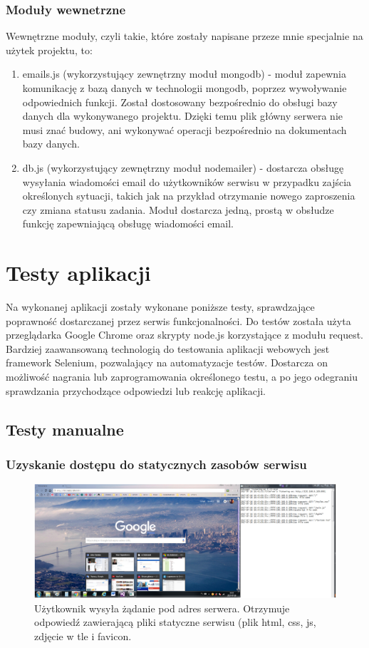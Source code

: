 \documentclass[12pt]{report}
\begin{document}
\subsection{Moduły wewnetrzne}
Wewnętrzne moduły, czyli takie, które zostały napisane przeze mnie specjalnie na użytek projektu, to:
\begin{enumerate}
\item emails.js (wykorzystujący zewnętrzny moduł mongodb) - moduł zapewnia komunikację z bazą danych w technologii mongodb, poprzez wywoływanie odpowiednich funkcji. 
Został dostosowany bezpośrednio do obsługi bazy danych dla wykonywanego projektu. 
Dzięki temu plik główny serwera nie musi znać budowy, ani wykonywać operacji bezpośrednio na dokumentach bazy danych.
\item db.js (wykorzystujący zewnętrzny moduł nodemailer) - dostarcza obsługę wysyłania wiadomości email do użytkowników serwisu w przypadku zajścia określonych sytuacji, takich jak na przykład otrzymanie nowego zaproszenia czy zmiana statusu zadania. Moduł dostarcza jedną, prostą w obsłudze funkcję zapewniającą obsługę wiadomości email. 
\end{enumerate}


\chapter{Testy aplikacji}
Na wykonanej aplikacji zostały wykonane poniższe testy, sprawdzające poprawność dostarczanej przez serwis funkcjonalności.
Do testów została użyta przeglądarka Google Chrome oraz skrypty node.js korzystające z modułu request.
Bardziej zaawansowaną technologią do testowania aplikacji webowych jest framework Selenium, pozwalający na automatyzacje testów. 
Dostarcza on możliwość nagrania lub zaprogramowania określonego testu, a po jego odegraniu sprawdzania przychodzące odpowiedzi lub reakcję aplikacji.

\newpage
\section{Testy manualne}
\subsection{Uzyskanie dostępu do statycznych zasobów serwisu}
\begin{figure}[!hb]
\centering
\includegraphics[width=\textwidth,height=\textheight,keepaspectratio]{12.png}
\captionsetup{labelformat=empty}
\caption[]{Użytkownik wysyła żądanie pod adres serwera. 
Otrzymuje odpowiedź zawierającą pliki statyczne serwisu (plik html, css, js, zdjęcie w tle i favicon.}
\end{figure}
\end{document}
